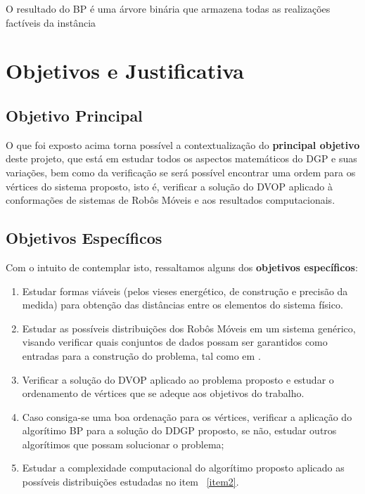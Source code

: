\documentclass[11pt]{article}
\begin{document}
{{O resultado do BP é uma árvore binária que armazena todas as realizações factíveis da instância

\section{Objetivos e Justificativa} \label{aims}


\subsection{Objetivo Principal}

O que foi exposto acima torna possível a contextualização do {\bf principal objetivo} deste projeto, que está em estudar todos os aspectos matemáticos do DGP e suas variações, bem como da verificação se será possível encontrar uma ordem para os vértices do sistema proposto, isto é, verificar a solução do DVOP aplicado à conformações de sistemas de Robôs Móveis e aos resultados computacionais.

\subsection{Objetivos Específicos}

Com o intuito de contemplar isto, ressaltamos alguns dos {\bf objetivos específicos}:

\begin{enumerate}[(1)]

\item Estudar formas viáveis (pelos vieses energético, de construção e precisão da medida) para obtenção das distâncias entre os elementos do sistema físico.

\item Estudar as possíveis distribuições dos Robôs Móveis em um sistema genérico, visando verificar quais conjuntos de dados possam ser garantidos como entradas para a construção do problema, tal como em \cite{NetworkLocalizationEren}. \label{item2}

\item Verificar a solução do DVOP aplicado ao problema proposto e estudar o ordenamento de vértices que se adeque aos objetivos do trabalho.

\item Caso consiga-se uma boa ordenação para os vértices, verificar a aplicação do algorítimo BP para a solução do DDGP proposto, se não, estudar outros algorítimos que possam solucionar o problema;

\item Estudar a complexidade computacional do algorítimo proposto aplicado as possíveis distribuições estudadas no item ~\ref{item2}.


\end{enumerate}}}
\end{document}
